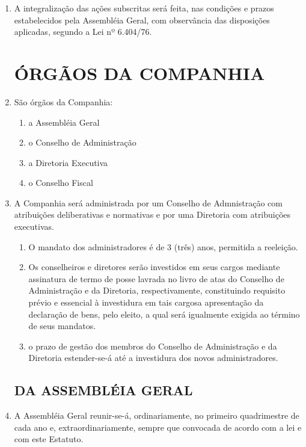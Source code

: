 \documentclass[a4paper,11pt]{report}
\begin{document}
\begin{enumerate}[resume, label=Art. \arabic*]
\item A integralização das ações subscritas será feita, nas condições e prazos estabelecidos pela Assembléia Geral, com observância das disposições aplicadas, segundo a Lei nº 6.404/76.

\chapter{ÓRGÃOS DA COMPANHIA}

\item São órgãos da Companhia:

\begin{enumerate}[label=\roman*.]
    \item a Assembléia Geral
    \item o Conselho de Administração
    \item a Diretoria Executiva
    \item o Conselho Fiscal
\end{enumerate}

\item A Companhia será administrada por um Conselho de Admnistração com atribuições deliberativas e normativas e por uma Diretoria com atribuições executivas.

\begin{enumerate}[label= \S \arabic*]
    \item O mandato dos administradores é de 3 (três) anos, permitida a reeleição.
    \item Os conselheiros e diretores serão investidos em seus  cargos mediante assinatura de termo de posse lavrada no livro de atas do Conselho de Administração e da Diretoria, respectivamente, constituindo requisito prévio e essencial à investidura em tais cargosa apresentação da declaração de bens, pelo eleito, a qual será igualmente exigida ao término de seus mandatos.
    \item o prazo de gestão dos membros do Conselho de Administração e da Diretoria estender-se-á até a investidura dos novos administradores.
\end{enumerate}


\section{DA ASSEMBLÉIA GERAL}

\item A Assembléia Geral reunir-se-á, ordinariamente, no primeiro quadrimestre de cada ano e, extraordinariamente, sempre que convocada de acordo com a lei e com este Estatuto.


\end{enumerate}
\end{document}
